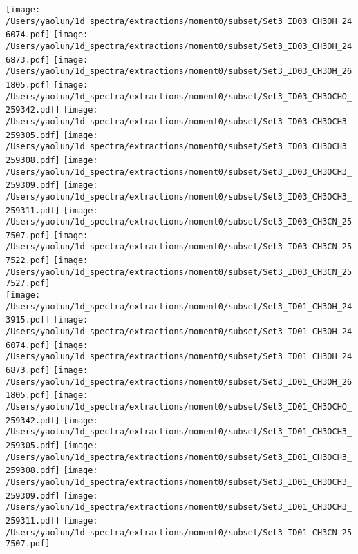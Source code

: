 \begin{figure*}[htbp!]
  \texttt{[image: /Users/yaolun/1d\_spectra/extractions/moment0/subset/Set3\_ID03\_CH3OH\_246074.pdf]}
  \texttt{[image: /Users/yaolun/1d\_spectra/extractions/moment0/subset/Set3\_ID03\_CH3OH\_246873.pdf]}
  \texttt{[image: /Users/yaolun/1d\_spectra/extractions/moment0/subset/Set3\_ID03\_CH3OH\_261805.pdf]}
  \texttt{[image: /Users/yaolun/1d\_spectra/extractions/moment0/subset/Set3\_ID03\_CH3OCHO\_259342.pdf]}
  \texttt{[image: /Users/yaolun/1d\_spectra/extractions/moment0/subset/Set3\_ID03\_CH3OCH3\_259305.pdf]}
  \texttt{[image: /Users/yaolun/1d\_spectra/extractions/moment0/subset/Set3\_ID03\_CH3OCH3\_259308.pdf]}
  \texttt{[image: /Users/yaolun/1d\_spectra/extractions/moment0/subset/Set3\_ID03\_CH3OCH3\_259309.pdf]}
  \texttt{[image: /Users/yaolun/1d\_spectra/extractions/moment0/subset/Set3\_ID03\_CH3OCH3\_259311.pdf]}
  \texttt{[image: /Users/yaolun/1d\_spectra/extractions/moment0/subset/Set3\_ID03\_CH3CN\_257507.pdf]}
  \texttt{[image: /Users/yaolun/1d\_spectra/extractions/moment0/subset/Set3\_ID03\_CH3CN\_257522.pdf]}
  \texttt{[image: /Users/yaolun/1d\_spectra/extractions/moment0/subset/Set3\_ID03\_CH3CN\_257527.pdf]}
  \\
  \texttt{[image: /Users/yaolun/1d\_spectra/extractions/moment0/subset/Set3\_ID01\_CH3OH\_243915.pdf]}
  \texttt{[image: /Users/yaolun/1d\_spectra/extractions/moment0/subset/Set3\_ID01\_CH3OH\_246074.pdf]}
  \texttt{[image: /Users/yaolun/1d\_spectra/extractions/moment0/subset/Set3\_ID01\_CH3OH\_246873.pdf]}
  \texttt{[image: /Users/yaolun/1d\_spectra/extractions/moment0/subset/Set3\_ID01\_CH3OH\_261805.pdf]}
  \texttt{[image: /Users/yaolun/1d\_spectra/extractions/moment0/subset/Set3\_ID01\_CH3OCHO\_259342.pdf]}
  \texttt{[image: /Users/yaolun/1d\_spectra/extractions/moment0/subset/Set3\_ID01\_CH3OCH3\_259305.pdf]}
  \texttt{[image: /Users/yaolun/1d\_spectra/extractions/moment0/subset/Set3\_ID01\_CH3OCH3\_259308.pdf]}
  \texttt{[image: /Users/yaolun/1d\_spectra/extractions/moment0/subset/Set3\_ID01\_CH3OCH3\_259309.pdf]}
  \texttt{[image: /Users/yaolun/1d\_spectra/extractions/moment0/subset/Set3\_ID01\_CH3OCH3\_259311.pdf]}
  \texttt{[image: /Users/yaolun/1d\_spectra/extractions/moment0/subset/Set3\_ID01\_CH3CN\_257507.pdf]}

\end{figure*}
